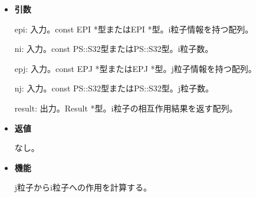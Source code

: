 \begin{itemize}

\item {\bf 引数}

  epi: 入力。const EPI *型またはEPI *型。i粒子情報を持つ配列。

  ni: 入力。const PS::S32型またはPS::S32型。i粒子数。

  epj: 入力。const EPJ *型またはEPJ *型。j粒子情報を持つ配列。
  
  nj: 入力。const PS::S32型またはPS::S32型。j粒子数。

  result: 出力。Result *型。i粒子の相互作用結果を返す配列。

\item {\bf 返値}

  なし。
  
\item {\bf 機能}

  j粒子からi粒子への作用を計算する。
  
\end{itemize}

